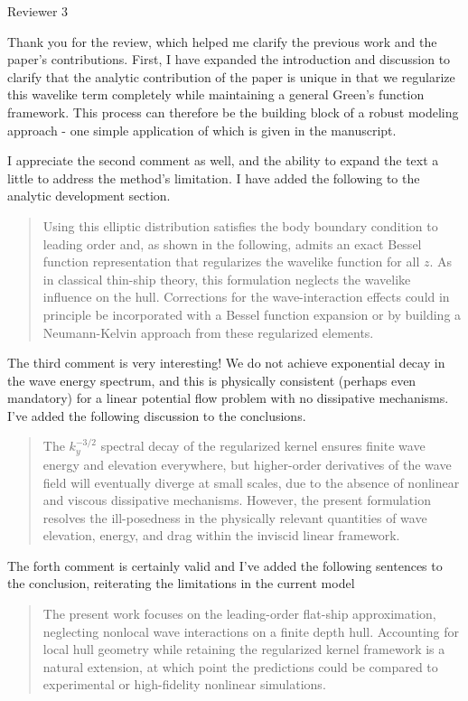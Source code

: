\documentclass[12pt]{letter}
\begin{document}
Reviewer 3
\vspace{1cm}

Thank you for the review, which helped me clarify the previous work and the paper's contributions. First, I have expanded the introduction and discussion to clarify that the analytic contribution of the paper is unique in that we regularize this wavelike term completely while maintaining a general Green's function framework. This process can therefore be the building block of a robust modeling approach - one simple application of which is given in the manuscript. 

I appreciate the second comment as well, and the ability to expand the text a little to address the method's limitation. I have added the following to the analytic development section.

\begin{quote}
    Using this elliptic distribution satisfies the body boundary condition to leading order and, as shown in the following, admits an exact Bessel function representation that regularizes the wavelike function for all $z$. As in classical thin-ship theory, this formulation neglects the wavelike influence on the hull. Corrections for the wave-interaction effects could in principle be incorporated with a Bessel function expansion or by building a Neumann-Kelvin approach from these regularized elements.
\end{quote}

The third comment is very interesting! We do not achieve exponential decay in the wave energy spectrum, and this is physically consistent (perhaps even mandatory) for a linear potential flow problem with no dissipative mechanisms. I've added the following discussion to the conclusions.

\begin{quote}
    The $k_y^{-3/2}$ spectral decay of the regularized kernel ensures finite wave energy and elevation everywhere, but higher-order derivatives of the wave field will eventually diverge at small scales, due to the absence of nonlinear and viscous dissipative mechanisms. However, the present formulation resolves the ill-posedness in the physically relevant quantities of wave elevation, energy, and drag within the inviscid linear framework. 
\end{quote}

The forth comment is certainly valid and I've added the following sentences to the conclusion, reiterating the limitations in the current model
\begin{quote}
    The present work focuses on the leading-order flat-ship approximation, neglecting nonlocal wave interactions on a finite depth hull. Accounting for local hull geometry while retaining the regularized kernel framework is a natural extension, at which point the predictions could be compared to experimental or high-fidelity nonlinear simulations. 
\end{quote}
\end{document}
